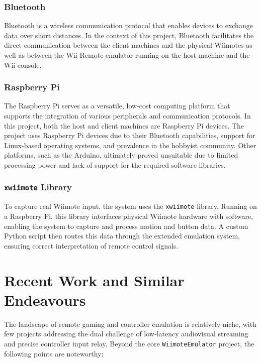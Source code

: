 \subsubsection{Bluetooth}
Bluetooth is a wireless communication protocol that enables devices to exchange data over short distances.  In the context of this project, Bluetooth facilitates the direct communication between the client machines and the physical Wiimotes as well as between the Wii Remote emulator running on the host machine and the Wii console.

\subsubsection{Raspberry Pi}
The Raspberry Pi serves as a versatile, low-cost computing platform that supports the integration of various peripherals and communication protocols. In this project, both the host and client machines are Raspberry Pi devices. The project uses Raspberry Pi devices due to their Bluetooth capabilities, support for Linux-based operating systems, and prevalence in the hobbyist community. Other platforms, such as the Arduino, ultimately proved unsuitable due to limited processing power and lack of support for the required software libraries.

\subsubsection{\texttt{xwiimote} Library\cite{xwiimote}}
To capture real Wiimote input, the system uses the \texttt{xwiimote} library. Running on a Raspberry Pi, this library interfaces physical Wiimote hardware with software, enabling the system to capture and process motion and button data. A custom Python script then routes this data through the extended emulation system, ensuring correct interpretation of remote control signals.


\section{Recent Work and Similar Endeavours}

The landscape of remote gaming and controller emulation is relatively niche, with few projects addressing the dual challenge of low-latency audiovisual streaming and precise controller input relay. Beyond the core \texttt{WiimoteEmulator} project, the following points are noteworthy:

